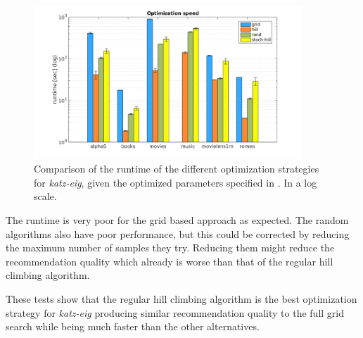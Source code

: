 \begin{figure}[h!]
    \centering
    \includegraphics[width=0.9\textwidth]{fig/comp/comp_katz_speed_log.png}
    \caption{Comparison of the runtime of the different optimization strategies for \textit{katz-eig}, given the optimized parameters specified in . In a log scale.}
\end{figure}

The runtime is very poor for the grid based approach as expected. The random algorithms also have poor performance, but this could be corrected by reducing the maximum number of samples they try. Reducing them might reduce the recommendation quality which already is worse than that of the regular hill climbing algorithm.

These tests show that the regular hill climbing algorithm is the best optimization strategy for \textit{katz-eig} producing similar recommendation quality to the full grid search while being much faster than the other alternatives.

